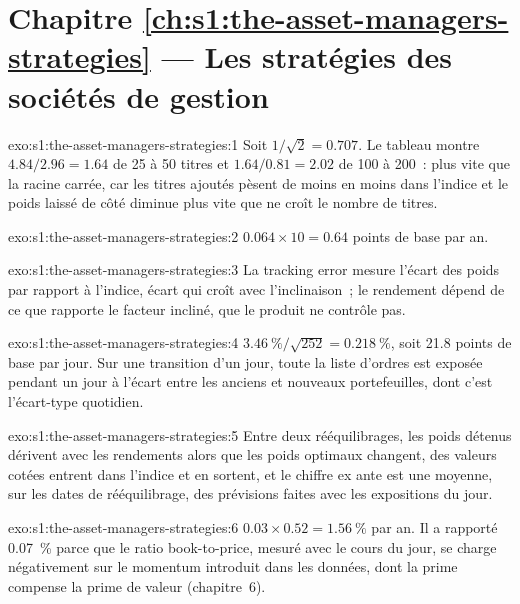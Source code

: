 \section*{Chapitre \ref{ch:s1:the-asset-managers-strategies} --- Les stratégies des sociétés de gestion}

\begin{solution}{exo:s1:the-asset-managers-strategies:1}
Soit $1/\sqrt{2} = 0.707$. Le tableau montre $4.84/2.96 = 1.64$ de 25 à 50 titres et $1.64/0.81 = 2.02$ de 100 à 200~: plus vite que la racine carrée,
car les titres ajoutés pèsent de moins en moins dans l'indice et le poids laissé de côté diminue plus vite que ne croît le nombre de titres.
\end{solution}

\begin{solution}{exo:s1:the-asset-managers-strategies:2}
$0.064 \times 10 = 0.64$ points de base par an.
\end{solution}

\begin{solution}{exo:s1:the-asset-managers-strategies:3}
La tracking error mesure l'écart des poids par rapport à l'indice, écart qui croît avec l'inclinaison~; le rendement dépend de ce que rapporte le facteur incliné, que le
produit ne contrôle pas.
\end{solution}

\begin{solution}{exo:s1:the-asset-managers-strategies:4}
$3.46~\%/\sqrt{252} = 0.218~\%$, soit 21.8 points de base par jour. Sur une transition d'un jour, toute la liste d'ordres est exposée pendant un jour à l'écart entre les
anciens et nouveaux portefeuilles, dont c'est l'écart-type quotidien.
\end{solution}

\begin{solution}{exo:s1:the-asset-managers-strategies:5}
Entre deux rééquilibrages, les poids détenus dérivent avec les rendements alors que les poids optimaux changent, des valeurs cotées entrent dans l'indice et en sortent, et le chiffre
ex ante est une moyenne, sur les dates de rééquilibrage, des prévisions faites avec les expositions du jour.
\end{solution}

\begin{solution}{exo:s1:the-asset-managers-strategies:6}
$0.03 \times 0.52 = 1.56~\%$ par an. Il a rapporté 0.07~\% parce que le ratio book-to-price, mesuré avec le cours du jour, se charge négativement sur le momentum introduit dans les données, dont
la prime compense la prime de valeur (chapitre~6).
\end{solution}

